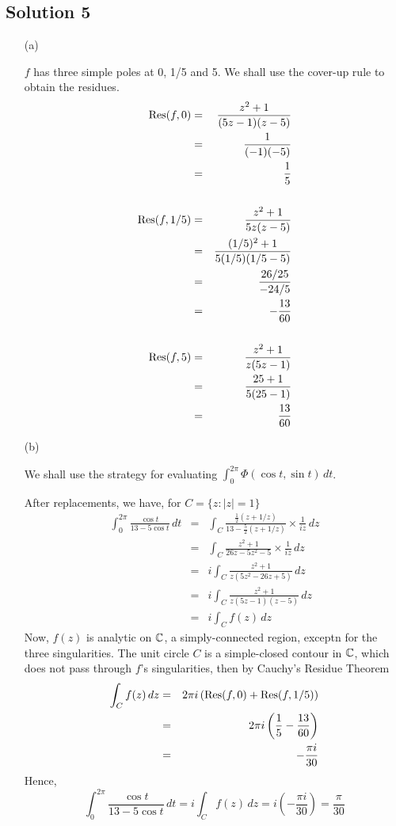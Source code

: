 \subsection*{Solution 5}

\begin{itemize}
\item[(a)]

$f$ has three simple poles at 0, 1/5 and 5. We shall use the cover-up
rule to obtain the residues.
\begin{eqnarray*}
{\rm Res}(f, 0)
	&=& \frac{ z^2+1 }{ (5z-1)(z-5) } \\
	&=& \frac{1}{(-1)(-5)} \\
	&=& \frac{1}{5} \\
\\
{\rm Res}(f, 1/5)
	&=& \frac{ z^2+1 }{ 5z(z-5) } \\
	&=& \frac{ (1/5)^2+1 }{ 5(1/5)(1/5-5) } \\
	&=& \frac{ 26/25 }{ -24/5 } \\
	&=& -\frac{13}{60} \\
\\
{\rm Res}(f, 5)
	&=& \frac{ z^2+1 }{ z(5z-1) } \\
	&=& \frac{ 25+1 }{ 5(25-1) } \\
	&=& \frac{13}{60}
\end{eqnarray*}

\item[(b)]

We shall use the strategy for evaluating
$\int_0^{2\pi}\Phi(\cos t, \sin t)\,dt$.

After replacements, we have, for $C=\{z:|z|=1\}$
\begin{eqnarray*}
\int_0^{2\pi} \frac{ \cos t }{ 13-5\cos t }\,dt
	&=& \int_C \frac{ \frac{1}{2}(z+1/z) }{ 13-\frac{5}{2}(z+1/z) } \times \frac{1}{iz}\,dz \\
	&=& \int_C \frac{ z^2+1 }{ 26z-5z^2-5 } \times \frac{1}{iz}\,dz \\
	&=& i \int_C \frac{ z^2+1 }{ z(5z^2-26z+5) }\,dz \\
	&=& i \int_C \frac{ z^2+1 }{ z(5z-1)(z-5) }\,dz \\
	&=& i \int_C f(z)\,dz
\end{eqnarray*}
Now, $f(z)$ is analytic on $\mathbb{C}$, a simply-connected region,
exceptn for the three singularities. The unit circle $C$ is a
simple-closed contour in $\mathbb{C}$, which does not pass through $f$'s
singularities, then by Cauchy's Residue Theorem
\begin{eqnarray*}
\int_C f(z)\,dz
	&=& 2\pi i\left({\rm Res}(f,0)+{\rm Res}(f,1/5)\right) \\
	&=& 2\pi i\left(\frac{1}{5}-\frac{13}{60}\right) \\
	&=& -\frac{\pi i}{30}
\end{eqnarray*}
Hence,
\[
\int_0^{2\pi} \frac{ \cos t }{ 13-5\cos t }\,dt
	= i \int_C f(z)\,dz
	= i \left( -\frac{\pi i}{30} \right)
	= \frac{\pi}{30}
\]

\end{itemize}

